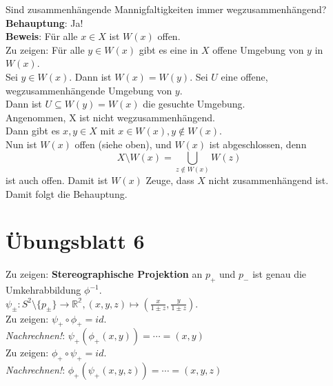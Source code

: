 \begin{problem*}[4b]
  Sind zusammenhängende Mannigfaltigkeiten immer wegzusammenhängend? \\
  \textbf{Behauptung}: Ja! \\
  \textbf{Beweis}: Für alle \( x \in X \) ist \( W(x) \) offen. \\
  Zu zeigen: Für alle \( y \in W(x) \) gibt es eine in \( X \) offene Umgebung von \( y \) in \( W(x) \). \\
  Sei \( y \in W(x) \). Dann ist \( W(x) = W(y) \). Sei \( U \) eine offene, wegzusammenhängende Umgebung von \( y \). \\
  Dann ist \( U \subseteq W(y) = W(x) \) die gesuchte Umgebung. \\
  Angenommen, X ist nicht wegzusammenhängend. \\
  Dann gibt es \( x,y \in X \) mit \( x \in W(x), y \notin W(x) \). \\
  Nun ist \( W(x) \) offen (siehe oben), und \( W(x) \) ist abgeschlossen, denn
  \begin{equation*}
    X \setminus W(x) = \bigcup_{z \notin W(x)} W(z)
  \end{equation*}
  ist auch offen. Damit ist \( W(x) \) Zeuge, dass \( X \) nicht zusammenhängend ist. Damit folgt die Behauptung.
\end{problem*}



%
\section{Übungsblatt 6}

\begin{problem*}[1a]
  Zu zeigen: \textbf{Stereographische Projektion} an \( p_+ \) und \( p_- \) ist genau die Umkehrabbildung \( \phi^{-1} \). \\
  \( \psi_\pm : S^2 \setminus \{ p_\pm \} \to \mathbb{R^2}, (x,y,z) \mapsto (\frac{x}{1\pm z},\frac{y}{1\pm z}) \). \\
  Zu zeigen: \( \psi_+ \circ \phi_+ = id \). \\ \emph{Nachrechnen!}: \( \psi_+ (\phi_+ (x,y)) = \cdots = (x,y) \) \\
  Zu zeigen: \( \phi_+ \circ \psi_+ = id \). \\ \emph{Nachrechnen!}: \( \phi_+ (\psi_+ (x,y,z)) = \cdots = (x,y,z) \) \\
\end{problem*}

